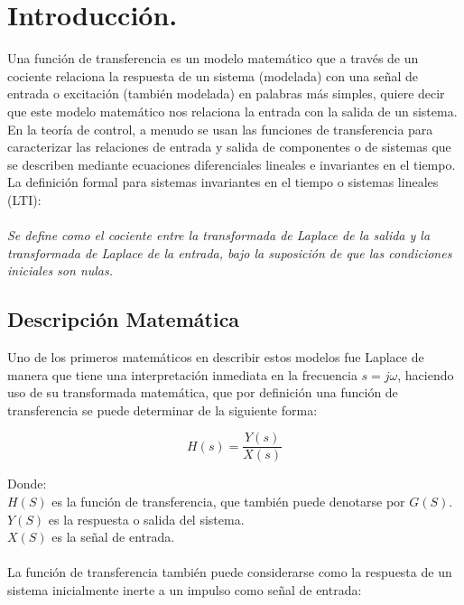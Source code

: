 \documentclass[12pt,a4paper]{article}
\begin{document}
\newpage
\section{Introducción.}
Una función de transferencia es un modelo matemático que a través de un cociente relaciona la respuesta de un sistema (modelada) con una señal de entrada o excitación (también modelada) en palabras más simples, quiere decir que este modelo matemático nos relaciona la entrada con la salida de un sistema.\\
	En la teoría de control, a menudo se usan las funciones de transferencia para caracterizar las relaciones de entrada y salida de componentes o de sistemas que se describen mediante ecuaciones diferenciales lineales e invariantes en el tiempo.\\
	La definición formal para sistemas invariantes en el tiempo o sistemas lineales (LTI): \\
	\\\textit{Se define como el cociente entre la transformada de Laplace de la salida y la transformada de Laplace de la entrada, bajo la suposición de que las condiciones iniciales son nulas.}
	
	\subsection{Descripción Matemática}
	Uno de los primeros matemáticos en describir estos modelos fue Laplace de manera que tiene una interpretación inmediata en la frecuencia $s = j\omega$, haciendo uso de su transformada matemática, que por definición una función de transferencia se puede determinar de la siguiente forma:
	
	\begin{equation*}
		H(s) = \frac{Y(s)}{X(s)}
	\end{equation*}
	
	Donde:\\
	$H(S)$ es la función de transferencia, que también puede denotarse por $G(S)$.\\
	$Y(S)$ es la respuesta o salida del sistema.\\
	$X(S)$ es la señal de entrada.\\
	\\
	La función de transferencia también puede considerarse como la respuesta de un sistema inicialmente inerte a un impulso como señal de entrada:
	
\end{document}
